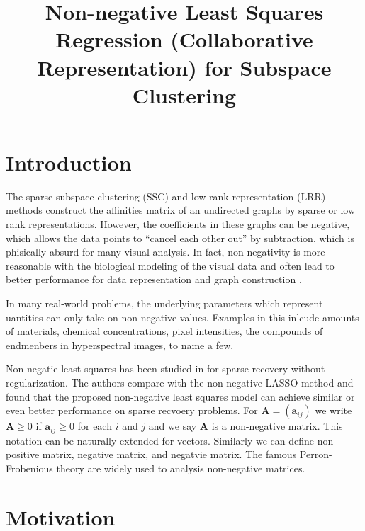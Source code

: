 \documentclass[10pt,twocolumn,letterpaper]{article}
\begin{document}
\title{Non-negative Least Squares Regression (Collaborative Representation) for Subspace Clustering}

\maketitle



\begin{abstract}

\end{abstract}

\section{Introduction}

The sparse subspace clustering (SSC) \cite{ssc} and low rank representation (LRR) \cite{lrr} methods construct the affinities matrix of an undirected graphs by sparse or low rank representations. However, the coefficients in these graphs can be negative, which allows the data points to ``cancel each other out'' by subtraction, which is phisically absurd for many visual analysis. In fact, non-negativity is more reasonable with the biological modeling of the visual data and often lead to better performance for data representation \cite{} and graph construction \cite{}.




In many real-world problems, the underlying parameters which represent uantities can only take on non-negative values. Examples in this inlcude amounts of materials, chemical concentrations, pixel intensities, the compounds of endmenbers in hyperspectral images, to name a few.

Non-negatie least squares has been studied in \cite{slawski2013non} for sparse recovery without regularization. The authors compare with the non-negative LASSO method \cite{kim2007interior} and found that the proposed non-negative least squares model can achieve similar or even better performance on sparse recvoery problems. For $\bm{A}=(\bm{a}_{ij})$ we write $\bm{A}\ge0$ if $\bm{a}_{ij}\ge0$ for each $i$ and $j$ and we say $\bm{A}$ is a non-negative matrix. This notation can be naturally extended for vectors. Similarly we can define non-positive matrix, negative matrix, and negatvie matrix. The famous Perron-Frobenious theory are widely used to analysis non-negative matrices.

\section{Motivation}
\end{document}

